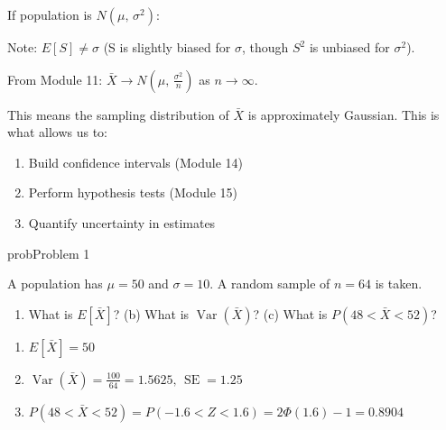
If population is $N(\mu,\, \sigma^{2})$:



Note: $E[S] \ne \sigma$ (S is slightly biased for $\sigma$, though $S^{2}$ is unbiased for $\sigma^{2}$).


From Module 11: $\bar{X} \to N\left(\mu,\, \frac{\sigma^{2}}{n}\right)$ as $n \to \infty$.

This means the sampling distribution of $\bar{X}$ is approximately Gaussian. This is what allows us to:

\begin{enumerate}
\def\labelenumi{\arabic{enumi}.}
\tightlist
\item
  Build confidence intervals (Module 14)
\item
  Perform hypothesis tests (Module 15)
\item
  Quantify uncertainty in estimates
\end{enumerate}


\begin{PSbox}[unbreakable]{prob}{Problem 1}

A population has $\mu = 50$ and $\sigma = 10$. A random sample of $n = 64$ is taken.

\begin{enumerate}
\def\labelenumi{(\alph{enumi})}
\tightlist
\item
  What is $E[\bar{X}]$? (b) What is $\operatorname{Var}(\bar{X})$? (c) What is $P(48 < \bar{X} < 52)$?
\end{enumerate}

\PSsolution{} 

\begin{enumerate}
\def\labelenumi{(\alph{enumi})}
\tightlist
\item
  $E[\bar{X}] = 50$
\item
  $\displaystyle \operatorname{Var}(\bar{X}) = \frac{100}{64} = 1.5625,\, \operatorname{SE} = 1.25$
\item
  $P(48 < \bar{X} < 52) = P(-1.6 < Z < 1.6) = 2\Phi (1.6) - 1 = 0.8904$
\end{enumerate}

\end{PSbox}

